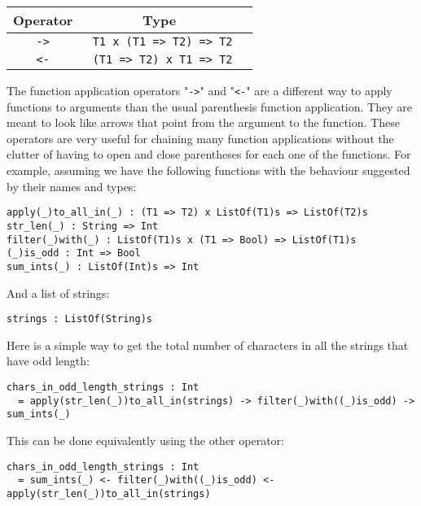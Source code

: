 \documentclass[diploma]{softlab-thesis}
\begin{document}
\begin{center}
\begin{tabular}{ |c|c|c| }
\hline
Operator & Type
\\
\hline
\hline
\verb|->| & \verb| T1 x (T1 => T2) => T2|
\\
\hline
\verb|<-| & \verb| (T1 => T2) x T1 => T2|
\\
\hline
\end{tabular}
\end{center}
The function application operators "\verb|->|" and "\verb|<-|" are a
different way to apply functions to arguments than the usual parenthesis
function application.  They are meant to look like arrows that point from the
argument to the function.  These operators are very useful for chaining many
function applications without the clutter of having to open and close
parentheses for each one of the functions.  For example, assuming we have the
following functions with the behaviour suggested by their names and types:
\begin{verbatim}
apply(_)to_all_in(_) : (T1 => T2) x ListOf(T1)s => ListOf(T2)s
str_len(_) : String => Int
filter(_)with(_) : ListOf(T1)s x (T1 => Bool) => ListOf(T1)s
(_)is_odd : Int => Bool
sum_ints(_) : ListOf(Int)s => Int
\end{verbatim}
And a list of strings:
\begin{verbatim}
strings : ListOf(String)s
\end{verbatim}
Here is a simple way to get the total number of characters in all the strings
that have odd length:
\begin{verbatim}
chars_in_odd_length_strings : Int
  = apply(str_len(_))to_all_in(strings) -> filter(_)with((_)is_odd) -> sum_ints(_)
\end{verbatim}
This can be done equivalently using the other operator:
\begin{verbatim}
chars_in_odd_length_strings : Int
  = sum_ints(_) <- filter(_)with((_)is_odd) <- apply(str_len(_))to_all_in(strings)

\end{verbatim}

\newpage
\end{document}
